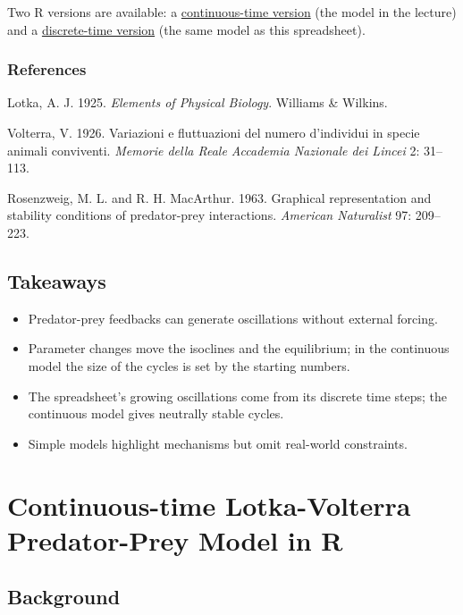 \documentclass[
  a4paper]{book}
\providecommand{\tightlist}{%
  \setlength{\itemsep}{0pt}\setlength{\parskip}{0pt}}
\begin{document}
Two R versions are available: a \href{continuous-time-lotka-volterra-predator-prey-model-in-r.html}{continuous-time version} (the model in the lecture) and a \href{discrete-time-lotka-volterra-predator-prey-model-in-r.html}{discrete-time version} (the same model as this spreadsheet).

\subsection{References}\label{references}

Lotka, A. J. 1925. \emph{Elements of Physical Biology}. Williams \& Wilkins.

Volterra, V. 1926. Variazioni e fluttuazioni del numero d'individui in specie animali conviventi. \emph{Memorie della Reale Accademia Nazionale dei Lincei} 2: 31--113.

Rosenzweig, M. L. and R. H. MacArthur. 1963. Graphical representation and stability conditions of predator-prey interactions. \emph{American Naturalist} 97: 209--223.

\section{Takeaways}\label{takeaways-20}

\begin{itemize}
\tightlist
\item
  Predator-prey feedbacks can generate oscillations without external forcing.
\item
  Parameter changes move the isoclines and the equilibrium; in the continuous model the size of the cycles is set by the starting numbers.
\item
  The spreadsheet's growing oscillations come from its discrete time steps; the continuous model gives neutrally stable cycles.
\item
  Simple models highlight mechanisms but omit real-world constraints.
\end{itemize}

\chapter{Continuous-time Lotka-Volterra Predator-Prey Model in R}\label{continuous-time-lotka-volterra-predator-prey-model-in-r}

\section{Background}\label{background-18}
\end{document}
